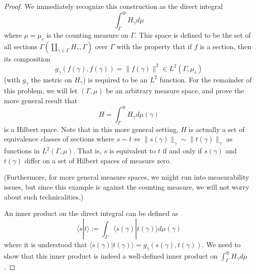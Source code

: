 \documentclass[fontsize=11pt]{scrartcl} %
\numberwithin{equation}{section} %
\numberwithin{figure}{section} %
\numberwithin{table}{section} %
\newcommand{\la}{\langle}
\newcommand{\ra}{\rangle}
\begin{document}
\begin{proof}
    We immediately recognize this construction as the direct integral
    \[
        \int_{\Gamma}^{\oplus}H_{\gamma}d\mu
    \]
    where $\mu=\mu_c$ is the counting measure on $\Gamma$. This space is defined
    to be the set of all sections
    $\Gamma(\coprod_{\gamma\in\Gamma}H_{\gamma},\Gamma)$ over $\Gamma$ with the
    property that if $f$ is a section, then its composition
    \[
        g_{\gamma}(f(\gamma),f(\gamma)) = \|f(\gamma)\|^2\in L^2(\Gamma,\mu_c)
    \]
    (with $g_{\gamma}$ the metric on $H_{\gamma}$)
    is required to be an $L^2$ function. 
    For the remainder of this problem, we will let $(\Gamma,\mu)$ be an
    arbitrary measure space, and prove the more general result that
    \[
        H = \int_{\Gamma}^{\oplus}H_{\gamma}d\mu(\gamma)
    \]
    is a Hilbert space. Note that in this more general setting, $H$ is actually
    a set of equivalence classes of sections where $s\sim t \iff
    \|s(\gamma)\|_{\gamma} \sim \|t(\gamma)\|_{\gamma}$ as functions in
    $L^2(\Gamma,\mu)$.
    That is, $s$ is equivalent to $t$ if and only if $s(\gamma)$ and
    $t(\gamma)$ differ on a set of Hilbert spaces of measure zero.
    
    (Furthermore, for more general measure spaces, we might run into
    measurability issues, but since this example is against the counting
measure, we will not worry about such technicalities.)

    An inner product on the direct integral can be defined as
    \[
        \la s|t\ra := \int_{\Gamma}\la s(\gamma)|t(\gamma)\ra d\mu(\gamma)
    \]
    where it is understood that $\la s(\gamma)|t(\gamma)\ra =
    g_{\gamma}(s(\gamma),t(\gamma))$.
    We need to show that this inner product is indeed a well-defined inner
    product on $\int_{\Gamma}^{\oplus}H_{\gamma}d\mu$.



\end{proof}
\end{document}

